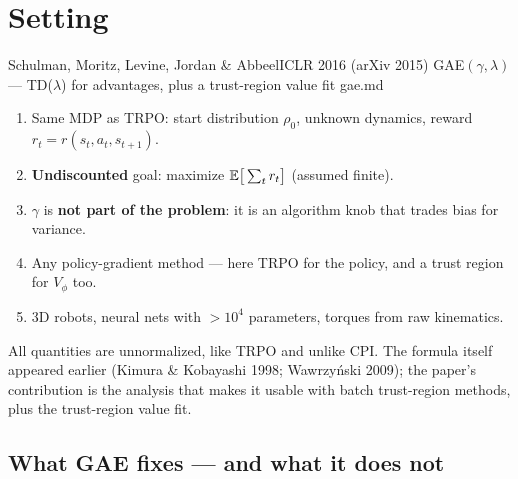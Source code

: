\section{Setting}

  {Schulman, Moritz, Levine, Jordan \& Abbeel}{ICLR 2016 (arXiv 2015)}
  {GAE$(\gamma,\lambda)$ --- TD($\lambda$) for advantages, plus a trust-region value fit}
  {gae.md}

\begin{enumerate}
  \item Same MDP as TRPO: start distribution $\rho_0$, unknown dynamics, reward $r_t=r(s_t,a_t,s_{t+1})$.
  \item \textbf{Undiscounted} goal: maximize $\mathbb{E}\big[\sum_t r_t\big]$ (assumed finite).
  \item $\gamma$ is \textbf{not part of the problem}: it is an algorithm knob that trades bias for variance.
  \item Any policy-gradient method --- here TRPO for the policy, and a trust region for $V_\phi$ too.
  \item 3D robots, neural nets with $>10^4$ parameters, torques from raw kinematics.
\end{enumerate}

\begin{notebox}
All quantities are unnormalized, like TRPO and unlike CPI. The formula itself appeared earlier (Kimura \& Kobayashi 1998; Wawrzy\'nski 2009); the paper's contribution is the analysis that makes it usable with batch trust-region methods, plus the trust-region value fit.
\end{notebox}

\subsection{What GAE fixes --- and what it does not}

